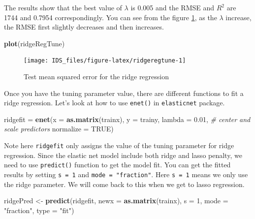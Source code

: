 \documentclass[12pt,]{krantz}
\makeatletter
\newenvironment{Shaded}{\begin{snugshade}}{\end{snugshade}}
\newcommand{\CommentTok}[1]{\textcolor[rgb]{0.37,0.37,0.37}{\textit{#1}}}
\newcommand{\DataTypeTok}[1]{\textcolor[rgb]{0.27,0.27,0.27}{#1}}
\newcommand{\DecValTok}[1]{\textcolor[rgb]{0.06,0.06,0.06}{#1}}
\newcommand{\FloatTok}[1]{\textcolor[rgb]{0.06,0.06,0.06}{#1}}
\newcommand{\KeywordTok}[1]{\textcolor[rgb]{0.27,0.27,0.27}{\textbf{#1}}}
\newcommand{\NormalTok}[1]{#1}
\newcommand{\OtherTok}[1]{\textcolor[rgb]{0.37,0.37,0.37}{#1}}
\newcommand{\StringTok}[1]{\textcolor[rgb]{0.5,0.5,0.5}{#1}}
\newenvironment{kframe}{%
\medskip{}
\setlength{\fboxsep}{.8em}
 \def\at@end@of@kframe{}%
 \ifinner\ifhmode%
  \def\at@end@of@kframe{\end{minipage}}%
  \begin{minipage}{\columnwidth}%
 \fi\fi%
 \def\FrameCommand##1{\hskip\@totalleftmargin \hskip-\fboxsep
 \colorbox{shadecolor}{##1}\hskip-\fboxsep
     \hskip-\linewidth \hskip-\@totalleftmargin \hskip\columnwidth}%
 \MakeFramed {\advance\hsize-\width
   \@totalleftmargin\z@ \linewidth\hsize
   \@setminipage}}%
 {\par\unskip\endMakeFramed%
 \at@end@of@kframe}
\renewenvironment{Shaded}{\begin{kframe}}{\end{kframe}}
\makeatother
\begin{document}
The results show that the best value of \(\lambda\) is 0.005 and the RMSE and \(R^{2}\) are 1744 and 0.7954 correspondingly. You can see from the figure \ref{fig:ridgeregtune}, as the \(\lambda\) increase, the RMSE first slightly decreases and then increases.

\begin{Shaded}
\begin{Highlighting}[]
\KeywordTok{plot}\NormalTok{(ridgeRegTune)}
\end{Highlighting}
\end{Shaded}

\begin{figure}

{\centering \texttt{[image: IDS\_files/figure-latex/ridgeregtune-1]} 

}

\caption{Test mean squared error for the ridge regression}\label{fig:ridgeregtune}
\end{figure}

Once you have the tuning parameter value, there are different functions to fit a ridge regression. Let's look at how to use \texttt{enet()} in \texttt{elasticnet} package.

\begin{Shaded}
\begin{Highlighting}[]
\NormalTok{ridgefit =}\StringTok{ }\KeywordTok{enet}\NormalTok{(}\DataTypeTok{x =} \KeywordTok{as.matrix}\NormalTok{(trainx), }\DataTypeTok{y =}\NormalTok{ trainy, }\DataTypeTok{lambda =} \FloatTok{0.01}\NormalTok{,}
                \CommentTok{# center and scale predictors}
                \DataTypeTok{normalize =} \OtherTok{TRUE}\NormalTok{)}
\end{Highlighting}
\end{Shaded}

Note here \texttt{ridgefit} only assigns the value of the tuning parameter for ridge regression. Since the elastic net model include both ridge and lasso penalty, we need to use \texttt{predict()} function to get the model fit. You can get the fitted results by setting \texttt{s\ =\ 1} and \texttt{mode\ =\ "fraction"}. Here \texttt{s\ =\ 1} means we only use the ridge parameter. We will come back to this when we get to lasso regression.

\begin{Shaded}
\begin{Highlighting}[]
\NormalTok{ridgePred <-}\StringTok{ }\KeywordTok{predict}\NormalTok{(ridgefit, }\DataTypeTok{newx =} \KeywordTok{as.matrix}\NormalTok{(trainx), }
                     \DataTypeTok{s =} \DecValTok{1}\NormalTok{, }\DataTypeTok{mode =} \StringTok{"fraction"}\NormalTok{, }\DataTypeTok{type =} \StringTok{"fit"}\NormalTok{)}
\end{Highlighting}
\end{Shaded}
\end{document}
